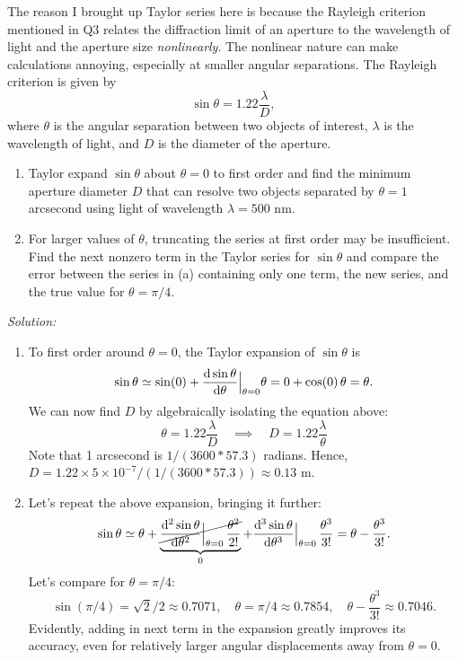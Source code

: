 \documentclass{article}
\begin{document}
\begin{tcolorbox}[colframe=blue!50!black, arc=2mm, title=\textsc{Practice 3}]
	The reason I brought up Taylor series here is because the Rayleigh criterion mentioned in Q3 relates the diffraction limit of an aperture to the wavelength of light and the aperture size \textit{nonlinearly}. The nonlinear nature can make calculations annoying, especially at smaller angular separations. The Rayleigh criterion is given by
	\[
		\sin \theta = 1.22 \frac{\lambda}{D},
	\]
	where $\theta$ is the angular separation between two objects of interest, $\lambda$ is the wavelength of light, and $D$ is the diameter of the aperture.
	\begin{enumerate}[label=(\alph*)]
		\item Taylor expand $\sin \theta$ about $\theta = 0$ to first order and find the minimum aperture diameter $D$ that can resolve two objects separated by $\theta = 1$ arcsecond using light of wavelength $\lambda = 500$ nm.
		\item For larger values of $\theta$, truncating the series at first order may be insufficient. Find the next nonzero term in the Taylor series for $\sin\theta$ and compare the error between the series in (a) containing only one term, the new series, and the true value for $\theta=\pi / 4$.
	\end{enumerate} 
\end{tcolorbox}

\textit{Solution:}

\vspace{1em}

\begin{enumerate}[label=(\alph*)]
    \item To first order around $\theta = 0$, the Taylor expansion of $\sin \theta$ is
    \[
    \sin \theta \simeq \sin(0) + \dv{\sin \theta}{\theta} \Big|_{\theta = 0} \theta = 0 + \cos(0) \, \theta = \theta.
    \]
    We can now find $D$ by algebraically isolating the equation above:
    \[
    \theta = 1.22 \frac{\lambda}{D} \quad \implies \quad D = 1.22 \frac{\lambda}{\theta}
    \]
    Note that 1 arcsecond is $1 / (3600*57.3)$ radians. Hence, $D = 1.22 \times 5 \times 10^{-7} / (1 / (3600*57.3)) \approx 0.13$ m.
    \item Let's repeat the above expansion, bringing it further:
    \[
    \sin\theta \simeq \theta + \underbrace{\cancel{\dv[2]{\sin \theta}{\theta} \Big|_{\theta = 0} \, \frac{\theta^2}{2!}}}_{0} + \dv[3]{\sin\theta}{\theta} \Big|_{\theta=0} \, \frac{\theta^3}{3!} = \theta - \frac{\theta^3}{3!}.
    \]
    Let's compare for $\theta = \pi / 4$:
    \[
    \sin(\pi / 4) = \sqrt{2} / 2 \approx 0.7071, \quad \theta = \pi / 4 \approx 0.7854, \quad \theta - \frac{\theta^3}{3!} \approx 0.7046.
    \]
    Evidently, adding in next term in the expansion greatly improves its accuracy, even for relatively larger angular displacements away from $\theta=0$.
\end{enumerate}
\end{document}
